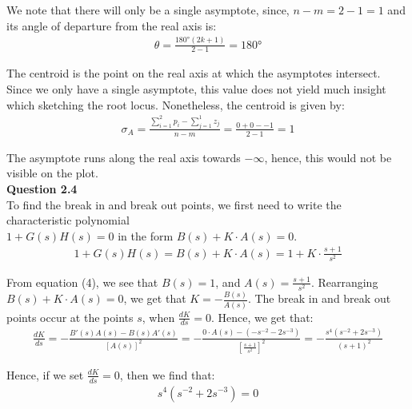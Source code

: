 \documentclass{article}
\begin{document}
	We note that there will only be a single asymptote, since, $n - m = 2 - 1 = 1$ and its angle of departure from the real axis is:
	\begin{align*}
		\theta = \frac{180\si{\degree}(2k+1)}{2 - 1} = 180\si{\degree}
	\end{align*}
	
	The centroid is the point on the real axis at which the asymptotes intersect. Since we only have a single asymptote, this value does not yield much insight which sketching the root locus. Nonetheless, the centroid is given by:
	\begin{align*}
		\sigma_A = \frac{\sum_{i = 1}^{2} p_i - \sum_{j = 1}^{1} z_j}{n - m} = \frac{0 + 0 - - 1}{2 - 1} = 1
	\end{align*}
	
	The asymptote runs along the real axis towards $-\infty$, hence, this would not be visible on the plot.\\


   \textbf{Question 2.4}\\
    
   To find the break in and break out points, we first need to write the characteristic polynomial\\ $1 + G(s)H(s) = 0$ in the form $B(s) + K \cdot A(s) = 0$.
   \begin{align}
	   1 + G(s)H(s) = B(s) + K \cdot A(s) = 1 + K \cdot \frac{s + 1}{s^2}
   \end{align}
   
   From equation (4), we see that $B(s) = 1$, and $A(s) = \frac{s + 1}{s^2}$. Rearranging $B(s) + K \cdot A(s) = 0$, we get that $K = -\frac{B(s)}{A(s)}$. The break in and break out points occur at the points $s$, when $\frac{dK}{ds} = 0$. Hence, we get that:
   \begin{align*}
	   \frac{dK}{ds} = - \frac{B'(s)A(s) - B(s)A'(s)}{[A(s)]^2} = - \frac{0 \cdot A(s) - (-s^{-2} - 2s^{-3})}{[\frac{s+1}{s^2}]^2} = - \frac{s^4(s^{-2} + 2s^{-3})}{(s+1)^2}
   \end{align*}
   
   Hence, if we set $\frac{dK}{ds} = 0$, then we find that:
   \begin{align}
	   s^4(s^{-2} + 2s^{-3}) = 0
   \end{align}
   
\end{document}
